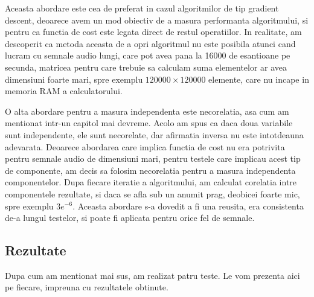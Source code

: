 \documentclass[12pt]{article}
\begin{document}
Aceasta abordare este cea de preferat in cazul algoritmilor de tip gradient descent, deoarece avem un mod obiectiv de a masura performanta algoritmului, si pentru ca functia de cost este legata direct de restul operatiilor. In realitate, am descoperit ca metoda aceasta de a opri algoritmul nu este posibila atunci cand lucram cu semnale audio lungi, care pot avea pana la 16000 de esantioane pe secunda, matricea pentru care trebuie sa calculam suma elementelor ar avea dimensiuni foarte mari, spre exemplu $120000 \times 120000$ elemente, care nu incape in memoria RAM a calculatorului. 

O alta abordare pentru a masura independenta este necorelatia, asa cum am mentionat intr-un capitol mai devreme. Acolo am spus ca daca doua variabile sunt independente, ele sunt necorelate, dar afirmatia inversa nu este intotdeauna adevarata. Deoarece abordarea care implica functia de cost nu era potrivita pentru semnale audio de dimensiuni mari, pentru testele care implicau acest tip de componente, am decis sa folosim necorelatia pentru a masura independenta componentelor. Dupa fiecare iteratie a algoritmului, am calculat corelatia intre componentele rezultate, si daca se afla sub un anumit prag, deobicei foarte mic, spre exemplu $3e^{-6}$. Aceasta abordare s-a dovedit a fi una reusita, era consistenta de-a lungul testelor, si poate fi aplicata pentru orice fel de semnale. 

\newpage
\subsection{Rezultate}
Dupa cum am mentionat mai sus, am realizat patru teste. Le vom prezenta aici pe fiecare, impreuna cu rezultatele obtinute.
\end{document}
